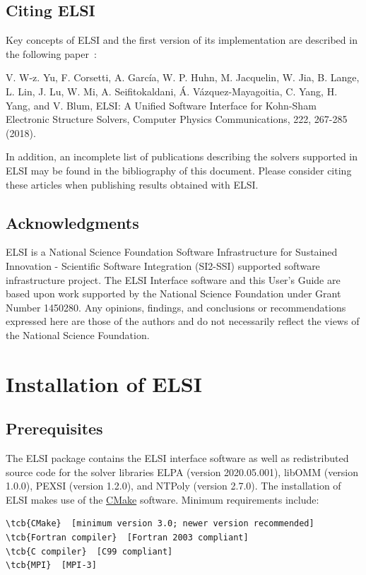 \documentclass{report}
\newcommand{\tcb}[1]{\textcolor{blue}{#1}}
\begin{document}
\section{Citing ELSI}
\label{sec:cite}
Key concepts of ELSI and the first version of its implementation are described in the following paper~\cite{elsi_yu_2018}:

V. W-z. Yu, F. Corsetti, A. Garc\'{i}a, W. P. Huhn, M. Jacquelin, W. Jia, B. Lange, L. Lin, J. Lu, W. Mi, A. Seifitokaldani, \'{A}. V\'{a}zquez-Mayagoitia, C. Yang, H. Yang, and V. Blum, ELSI: A Unified Software Interface for Kohn-Sham Electronic Structure Solvers, Computer Physics Communications, 222, 267-285 (2018).

In addition, an incomplete list of publications describing the solvers supported in ELSI may be found in the bibliography of this document. Please consider citing these articles when publishing results obtained with ELSI.

\section{Acknowledgments}
\label{sec:thanks}
ELSI is a National Science Foundation Software Infrastructure for Sustained Innovation - Scientific Software Integration (SI2-SSI) supported software infrastructure project. The ELSI Interface software and this User's Guide are based upon work supported by the National Science Foundation under Grant Number 1450280. Any opinions, findings, and conclusions or recommendations expressed here are those of the authors and do not necessarily reflect the views of the National Science Foundation.

\chapter{Installation of ELSI}
\section{Prerequisites}
\label{sec:prereq}
The ELSI package contains the ELSI interface software as well as redistributed source code for the solver libraries ELPA (version 2020.05.001), libOMM (version 1.0.0), PEXSI (version 1.2.0), and NTPoly (version 2.7.0). The installation of ELSI makes use of the \href{https://cmake.org}{CMake} software. Minimum requirements include:
\begin{Verbatim}[commandchars=\\\{\}]
\tcb{CMake}  [minimum version 3.0; newer version recommended]
\tcb{Fortran compiler}  [Fortran 2003 compliant]
\tcb{C compiler}  [C99 compliant]
\tcb{MPI}  [MPI-3]
\end{Verbatim}
\end{document}
